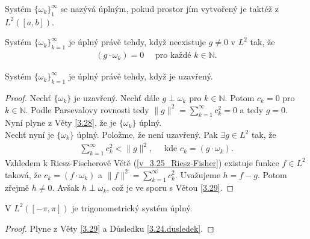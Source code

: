 \begin{definition}\label{3.27.def}
Systém $\{ \omega_k \}_1^\infty$ se nazývá úplným, pokud prostor jím vytvořený je taktéž z $L^2([a,b])$.
\end{definition}

\begin{theorem}\label{3.28}
Systém $\{ \omega_k \}_{k=1}^{\infty}$ je úplný právě tehdy, když neexistuje $g \neq 0$ v $L^2$ tak, že
\begin{align*}
(g \cdot \omega_k) = 0 \quad \textrm{ pro každé } k \in \mathbb{N}.
\end{align*}
\end{theorem}

\begin{theorem}\label{3.29}
Systém $\{ \omega_k \}_{k=1}^{\infty}$ je úplný právě tehdy, když je uzavřený.
\end{theorem}
\begin{proof}
Nechť $\{ \omega_k \}$ je uzavřený. Nechť dále $g \perp \omega_k$ pro $k \in \mathbb{N}$. Potom $c_k = 0$ pro $k \in \mathbb{N}$. Podle Parsevalovy rovnosti tedy $\|g\|^2 = \sum \limits _{k=1}^\infty c_k^2 = 0$ a tedy $g = 0$. Nyní plyne z Věty \ref{3.28}, že je $\{ \omega_k \}$ úplný. \\
Nechť nyní je $\{ \omega_k \}$ úplný. Položme, že není uzavřený. Pak $\exists g \in L^2$ tak, že
\begin{align*}
\sum \limits _{k=1}^{\infty} c_k^2 < \|g\|^2, \quad \textrm{ kde } c_k = (g \cdot \omega_k).
\end{align*}
Vzhledem k Riesz-Fischerově Větě (\ref{v_3.25_Riesz-Fisher}) existuje funkce $f \in L^2$ taková, že $c_k = (f \cdot \omega_k)$ a $\|f\|^2 = \sum \limits _{k=1}^\infty c_k^2$. Uvažujeme $h = f - g$. Potom zřejmě $h \neq 0$. Avšak $h \perp \omega_k$, což je ve sporu s Větou \ref{3.29}.
\end{proof}


\begin{dusledek}\label{3.30.dusledek}
V $L^2 ([ -\pi, \pi])$ je trigonometrický systém úplný.
\end{dusledek}
\begin{proof}
Plyne z Věty \ref{3.29} a Důsledku \ref{3.24.dusledek}.
\end{proof}


